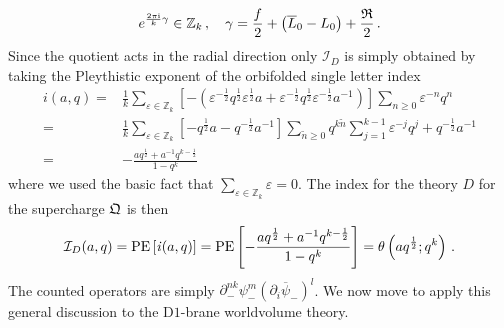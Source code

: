 \documentclass[main.tex]{subfiles}
\begin{document}
\begin{equation}
 e^{\frac{2\pi\mathrm{i}}{k}\gamma}\in\mathbb{Z}_k\,,\quad\gamma=\frac{f}{2}+\left(\overline{L}_0-L_0\right)+\frac{\mathfrak{R}}{2}\,.
\end{equation}
Since the quotient acts in the radial direction only $\mathcal{I}_D$ is simply obtained by taking the Pleythistic exponent of the orbifolded single letter index
\begin{align}
i(a,q)=&\frac{1}{k}\sum_{\varepsilon\in\mathbb{Z}_k}\left[-\left(\varepsilon^{-\frac{1}{2}}q^{\frac{1}{2}}\varepsilon^{\frac{1}{2}}a+\varepsilon^{-\frac{1}{2}}q^{\frac{1}{2}}\varepsilon^{-\frac{1}{2}}a^{-1}\right)\right]\sum_{n\geq0}\varepsilon^{-n}q^n\\
=&\frac{1}{k}\sum_{\varepsilon\in\mathbb{Z}_k}\left[-q^{\frac{1}{2}}a-q^{-\frac{1}{2}}a^{-1}\right]\sum_{\tilde{n}\geq0}q^{k\tilde{n}}\sum_{j=1}^{k-1}\varepsilon^{-j}q^j+q^{-\frac{1}{2}}a^{-1}\\
=&-\frac{aq^{\frac{1}{2}}+a^{-1}q^{k-\frac{1}{2}}}{1-q^k}
\end{align}
where we used the basic fact that $\sum\limits_{\varepsilon\in\mathbb{Z}_k}\varepsilon=0$. The index for the theory $D$ for the supercharge $\mathfrak{Q}$ is then
\begin{equation}
\mathcal{I}_D(a,q)=\operatorname{\mathrm{PE}}\left[\mathit{i}(a,q)\right]=\operatorname{\mathrm{PE}}\left[-\frac{aq^{\frac{1}{2}}+a^{-1}q^{k-\frac{1}{2}}}{1-q^k}\right]=\theta\left(aq^{\frac{1}{2}};q^k\right)\,.
\end{equation}
The counted operators are simply $\partial_-^{nk}\psi_-^m(\partial_i\overline{\psi}_-)^l$. 
We now move to apply this general discussion to the D$1$-brane worldvolume theory.
\end{document}
